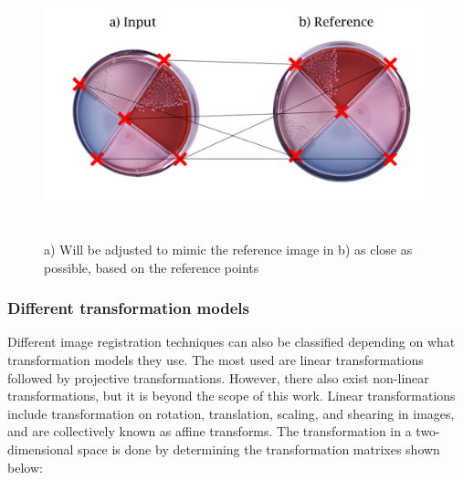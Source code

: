 \begin{figure}[H]
    \centering
     \includegraphics[width=0.8\linewidth]{figures/PDF/Image_reg_theory.pdf}\\\\
    \caption{a) Will be adjusted to mimic the reference image in b) as close as possible, based on the reference points}
    \label{fig:image reg}
\end{figure}

\subsubsection{Different transformation models}
Different image registration techniques\cite{Nag} can also be classified depending on what transformation models they use. The most used are linear transformations followed by projective transformations. However, there also exist non-linear transformations, but it is beyond the scope of this work. Linear transformations include transformation on rotation, translation, scaling, and shearing in images, and are collectively known as affine transforms. The transformation in a two-dimensional space is done by determining the transformation matrixes shown below: \\

